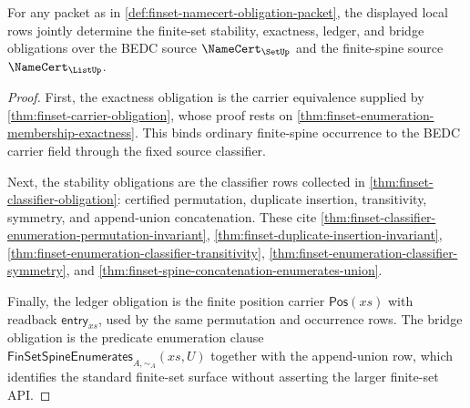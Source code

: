 \begin{theorem}
\label{thm:finset-stability-exactness-ledger-obligation}
For any packet as in \autoref{def:finset-namecert-obligation-packet}, the displayed local rows jointly determine the finite-set stability, exactness, ledger, and bridge obligations over the BEDC source $\NameCert_{\SetUp}$ and the finite-spine source $\NameCert_{\ListUp}$.
\end{theorem}
\begin{proof}
First, the exactness obligation is the carrier equivalence supplied by \autoref{thm:finset-carrier-obligation}, whose proof rests on \autoref{thm:finset-enumeration-membership-exactness}. This binds ordinary finite-spine occurrence to the BEDC carrier field through the fixed source classifier.

Next, the stability obligations are the classifier rows collected in \autoref{thm:finset-classifier-obligation}: certified permutation, duplicate insertion, transitivity, symmetry, and append-union concatenation. These cite \autoref{thm:finset-classifier-enumeration-permutation-invariant}, \autoref{thm:finset-duplicate-insertion-invariant}, \autoref{thm:finset-enumeration-classifier-transitivity}, \autoref{thm:finset-enumeration-classifier-symmetry}, and \autoref{thm:finset-spine-concatenation-enumerates-union}.

Finally, the ledger obligation is the finite position carrier $\mathsf{Pos}(xs)$ with readback $\mathsf{entry}_{xs}$, used by the same permutation and occurrence rows. The bridge obligation is the predicate enumeration clause $\mathsf{FinSetSpineEnumerates}_{A,\sim_A}(xs,U)$ together with the append-union row, which identifies the standard finite-set surface without asserting the larger finite-set API.
\end{proof}

